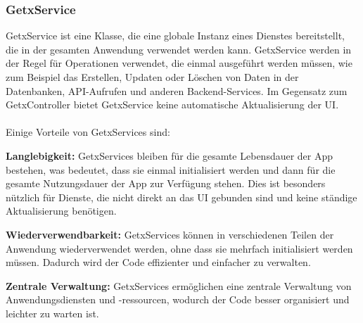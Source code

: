 \subsubsection{GetxService}
GetxService ist eine Klasse, die eine globale Instanz eines Dienstes bereitstellt, die in der gesamten Anwendung verwendet werden kann. GetxService werden in der Regel für Operationen verwendet, die einmal ausgeführt werden müssen, wie zum Beispiel das Erstellen, Updaten oder Löschen von Daten in der Datenbanken, API-Aufrufen und anderen Backend-Services. Im Gegensatz zum GetxController bietet GetxService keine automatische Aktualisierung der UI.
\\\\
Einige Vorteile von GetxServices sind:

\textbf{Langlebigkeit:}
GetxServices bleiben für die gesamte Lebensdauer der App bestehen, was bedeutet, dass sie einmal initialisiert werden und dann für die gesamte Nutzungsdauer der App zur Verfügung stehen. Dies ist besonders nützlich für Dienste, die nicht direkt an das UI gebunden sind und keine ständige Aktualisierung benötigen.

\textbf{Wiederverwendbarkeit:}
GetxServices können in verschiedenen Teilen der Anwendung wiederverwendet werden, ohne dass sie mehrfach initialisiert werden müssen. Dadurch wird der Code effizienter und einfacher zu verwalten.

\textbf{Zentrale Verwaltung:}
GetxServices ermöglichen eine zentrale Verwaltung von Anwendungsdiensten und -ressourcen, wodurch der Code besser organisiert und leichter zu warten ist.

